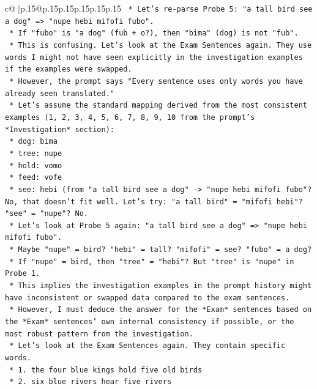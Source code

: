 \documentclass{article}
\begin{document}
{\begin{supertabular}{c@{$\;$}|p{.15\linewidth}@{}p{.15\linewidth}p{.15\linewidth}p{.15\linewidth}p{.15\linewidth}p{.15\linewidth}}
{{{\texttt{        *   Let's re{-}parse Probe 5: "a tall bird see a dog" => "nupe hebi mifofi fubo".} \\
\texttt{        *   If "fubo" is "a dog" (fub + o?), then "bima" (dog) is not "fub".} \\
\texttt{        *   This is confusing. Let's look at the Exam Sentences again. They use words I might not have seen explicitly in the investigation examples if the examples were swapped.} \\
\texttt{        *   However, the prompt says "Every sentence uses only words you have already seen translated."} \\
\texttt{        *   Let's assume the standard mapping derived from the most consistent examples (1, 2, 3, 4, 5, 6, 7, 8, 9, 10 from the prompt's *Investigation* section):} \\
\texttt{            *   dog: bima} \\
\texttt{            *   tree: nupe} \\
\texttt{            *   hold: vomo} \\
\texttt{            *   feed: vofe} \\
\texttt{            *   see: hebi (from "a tall bird see a dog" {-}> "nupe hebi mifofi fubo"? No, that doesn't fit well. Let's try: "a tall bird" = "mifofi hebi"? "see" = "nupe"? No.} \\
\texttt{            *   Let's look at Probe 5 again: "a tall bird see a dog" => "nupe hebi mifofi fubo".} \\
\texttt{                *   Maybe "nupe" = bird? "hebi" = tall? "mifofi" = see? "fubo" = a dog?} \\
\texttt{                *   If "nupe" = bird, then "tree" = "hebi"? But "tree" is "nupe" in Probe 1.} \\
\texttt{                *   This implies the investigation examples in the prompt history might have inconsistent or swapped data compared to the exam sentences.} \\
\texttt{                *   However, I must deduce the answer for the *Exam* sentences based on the *Exam* sentences' own internal consistency if possible, or the most robust pattern from the investigation.} \\
\texttt{                *   Let's look at the Exam Sentences again. They contain specific words.} \\
\texttt{                *   1. the four blue kings hold five old birds} \\
\texttt{                *   2. six blue rivers hear five rivers} \\
}}}
\end{supertabular}}
\end{document}

